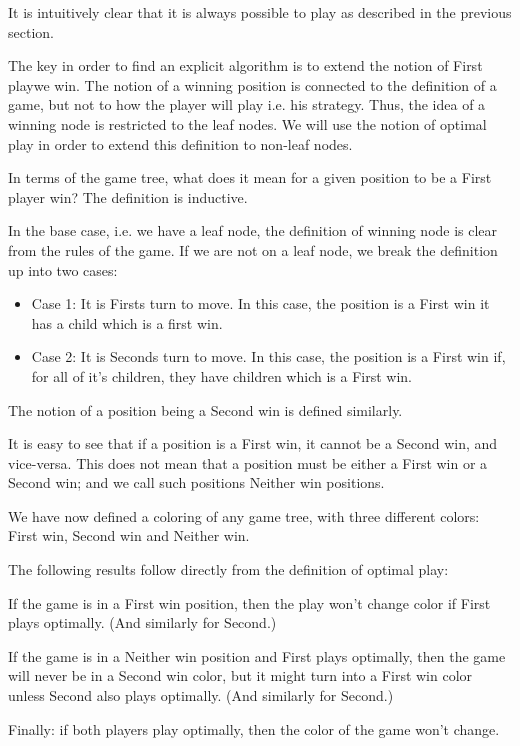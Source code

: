It is intuitively clear that it is always possible to play as described in the previous section.

The key in order to find an explicit algorithm is to extend the notion of First playwe win.
The notion of a winning position is connected to the definition of a game, but not to how the player will play i.e. his strategy.
Thus, the idea of a winning node is restricted to the leaf nodes.
We will use the notion of optimal play in order to extend this definition to non-leaf nodes.

In terms of the game tree, what does it mean for a given position to be a First player win?
The definition is inductive.

In the base case, i.e. we have a leaf node, the definition of winning node is clear from the rules of the game.
If we are not on a leaf node, we break the definition up into two cases:

\begin{itemize}
  \item Case 1: It is Firsts turn to move.
    In this case, the position is a First win it has a child which is a first win.
  \item Case 2: It is Seconds turn to move.
    In this case, the position is a First win if, for all of it's children, they have children which is a First win.
\end{itemize}

The notion of a position being a Second win is defined similarly.

It is easy to see that if a position is a First win, it cannot be a Second win, and vice-versa.
This does not mean that a position must be either a First win or a Second win; and we call such positions Neither win positions.

We have now defined a coloring of any game tree, with three different colors: First win, Second win and Neither win.

The following results follow directly from the definition of optimal play:

If the game is in a First win position, then the play won't change color if First plays optimally.
(And similarly for Second.)

If the game is in a Neither win position and First plays optimally, then the game will never be in a Second win color, but it might turn into a First win color unless Second also plays optimally.
(And similarly for Second.)

Finally: if both players play optimally, then the color of the game won't change.

